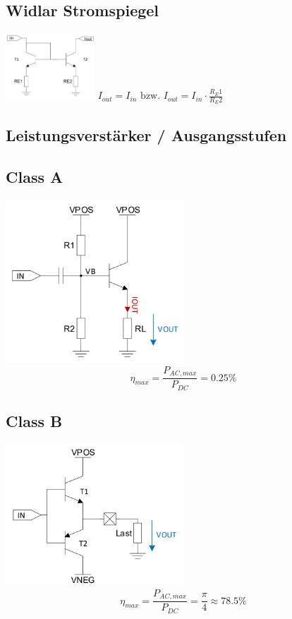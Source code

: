 \documentclass[margin=normal]{tex/hsrzf}
\begin{document}
\subsection*{Widlar Stromspiegel}
\includegraphics[width = 0.25\textwidth]{img/Transistor/Widlar.png}
$I_{out} = I_{in} \textrm{ bzw. } I_{out} = I_{in} \cdot \frac{R_E1}{R_E2}$
\subsection{Leistungsverstärker / Ausgangsstufen}
\begin{minipage}{0.33\textwidth}
  \subsection*{Class A}
  \includegraphics[width = 0.5\textwidth]{img/Verstärker/ClassAVerstärker.png}
  $$\eta_{max} = \frac{P_{AC,max}}{P_{DC}} = 0.25\%$$
\end{minipage}%
\begin{minipage}{0.33\textwidth}
  \subsection*{Class B}
  \includegraphics[width = 0.5\textwidth]{img/Verstärker/ClassBVerstärker.png}
  $$\eta_{max} = \frac{P_{AC,max}}{P_{DC}} = \frac{\pi}{4} \approx 78.5\%$$
\end{minipage}%
\end{document}
